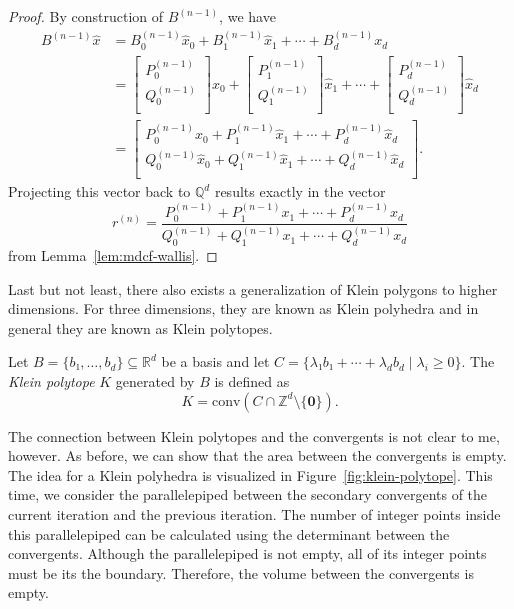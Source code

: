 \begin{proof}
  By construction of $B^{(n-1)}$, we have
  \begin{align*}
    B^{(n-1)} \hat x
    & = B_0^{(n-1)} \hat x_0 + B_1^{(n-1)} \hat x_1 + ⋯ + B_d^{(n-1)} x_d \\
    & =
    \begin{bmatrix}
      P_0^{(n-1)} \\
      Q_0^{(n-1)} \\
    \end{bmatrix} \hat x_0
    + \begin{bmatrix}
      P_1^{(n-1)} \\
      Q_1^{(n-1)} \\
    \end{bmatrix} \hat x_1
    + ⋯ + \begin{bmatrix}
      P_d^{(n-1)} \\
      Q_d^{(n-1)} \\
    \end{bmatrix} \hat x_d \\
    & = \begin{bmatrix}
      P_0^{(n-1)} \hat x_0 + P_1^{(n-1)} \hat x_1 + ⋯ + P_d^{(n-1)} \hat x_d \\
      Q_0^{(n-1)} \hat x_0 + Q_1^{(n-1)} \hat x_1 + ⋯ + Q_d^{(n-1)} \hat x_d \\
    \end{bmatrix}.
  \end{align*}
  Projecting this vector back to $ℚ^d$ results exactly in the vector
  \[
    r^{(n)} = \frac{P_0^{(n-1)} + P_1^{(n-1)} x_1 + ⋯ + P_d^{(n-1)} x_d}{Q_0^{(n-1)} + Q_1^{(n-1)} x_1 + ⋯ + Q_d^{(n-1)} x_d}
  \]
  from
  Lemma~\ref{lem:mdcf-wallis}.
\end{proof}

\iffalse
Last but not least,
there also exists a generalization of Klein polygons to higher dimensions.
For three dimensions, they are known as Klein polyhedra
and in general they are known as Klein polytopes.

\begin{definition}
  Let $B = \{b₁, …, b_d\} ⊆ ℝ^d$ be a basis and let $C = \{ λ₁ b₁ + ⋯ + λ_d b_d \mid λ_i ≥ 0 \}$.
  The \emph{Klein polytope} $K$ generated by $B$ is defined as
  \[
    K = \mathrm{conv}(C ∩ ℤ^d \setminus \{\symbf 0\}).
  \]
\end{definition}

The connection between Klein polytopes and the convergents is not clear to me, however.
As before, we can show that the area between the convergents is empty.
The idea for a Klein polyhedra is visualized in Figure~\ref{fig:klein-polytope}.
This time, we consider the parallelepiped between the secondary convergents of the
current iteration and the previous iteration.
The number of integer points inside this parallelepiped can be calculated using
the determinant between the convergents.
Although the parallelepiped is not empty,
all of its integer points must be its the boundary.
Therefore, the volume between the convergents is empty.

